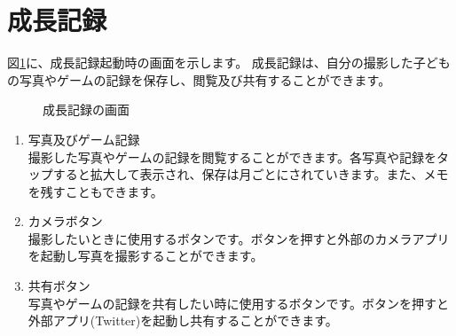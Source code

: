 \documentclass[a4j]{jarticle}
\begin{document}

\section{成長記録}\label{grow}
図\ref{Grow}に、成長記録起動時の画面を示します。
成長記録は、自分の撮影した子どもの写真やゲームの記録を保存し、閲覧及び共有することができます。

\begin{figure}[H]
    \begin{center}
    \caption {成長記録の画面}
    \label{Grow}
    \end{center}
\end{figure}

\begin{enumerate}
  \renewcommand{\labelenumi}{\textcircled{\scriptsize \theenumi}}
  \item 写真及びゲーム記録\\
       撮影した写真やゲームの記録を閲覧することができます。各写真や記録をタップすると拡大して表示され、保存は月ごとにされていきます。また、メモを残すこともできます。
  \item カメラボタン\\
        撮影したいときに使用するボタンです。ボタンを押すと外部のカメラアプリを起動し写真を撮影することができます。
  \item 共有ボタン\\
        写真やゲームの記録を共有したい時に使用するボタンです。ボタンを押すと外部アプリ(Twitter)を起動し共有することができます。
\end{enumerate}
\end{document}
